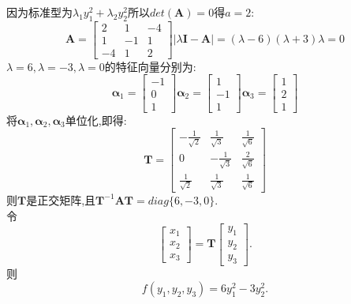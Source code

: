 \documentclass[lang=cn,11pt,normal]{elegantbook}
\renewcommand{\AA}{\boldsymbol{A}}
\newcommand{\II}{\boldsymbol{I}}
\newcommand{\TT}{\boldsymbol{T}}
\begin{document}
	\begin{solution}
		因为标准型为$\lambda_1y_1^2+\lambda_2y_2^2$所以$det(\AA)=0$得$a=2$:
		\begin{equation}
		\AA=
		\begin{bmatrix}
		2&1&-4\\
		1&-1&1\\
		-4&1&2
		\end{bmatrix}
		|\lambda\II-\AA|=(\lambda-6)(\lambda+3)\lambda=0
		\end{equation}
		$\lambda=6,\lambda=-3,\lambda=0$的特征向量分别为:
		\begin{equation}\boldsymbol{\alpha}_1=
		\begin{bmatrix}
		-1\\0\\1
		\end{bmatrix}
		\boldsymbol{\alpha}_2=
		\begin{bmatrix}
		1\\-1\\1
		\end{bmatrix}
		\boldsymbol{\alpha}_3=
		\begin{bmatrix}
		1\\2\\1
		\end{bmatrix}
		\end{equation}
		将$\boldsymbol{\alpha}_1,\boldsymbol{\alpha}_2,\boldsymbol{\alpha}_3$单位化,即得:
		\begin{equation}
		\TT=
		\begin{bmatrix}
		-\frac{1}{\sqrt{2}}&\frac{1}{\sqrt{3}}&\frac{1}{\sqrt{6}}\\
		0&-\frac{1}{\sqrt{3}}&\frac{2}{\sqrt{6}}\\
		\frac{1}{\sqrt{2}}&\frac{1}{\sqrt{3}}&\frac{1}{\sqrt{6}}
		\end{bmatrix}
		\end{equation}
		则$\TT$是正交矩阵,且$\TT^{-1}\AA\TT=diag\{6,-3,0\}$.\\
		令
		\begin{equation}
		\begin{bmatrix}
		x_1\\x_2\\x_3
		\end{bmatrix}
		=
		\TT
		\begin{bmatrix}
		y_1\\y_2\\y_3
		\end{bmatrix}.
		\end{equation}
		则\\
		\begin{equation}
		f(y_1,y_2,y_3)=6y_1^2-3y_2^2.
		\end{equation}
	\end{solution}
\end{document}

